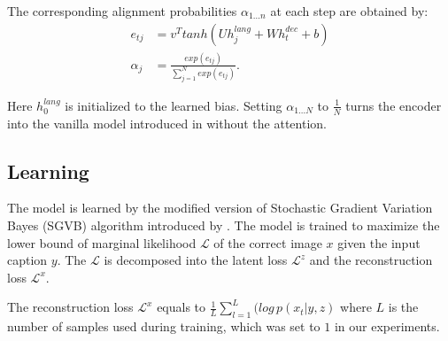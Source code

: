 \documentclass{article} %
\newcommand{\hlang}{h^{lang}}
\newcommand{\hdec}{h^{dec}}
\newcommand{\loss}{\mathcal{L}}
\newcommand{\lloss}{\mathcal{L}^{z}}
\newcommand{\rloss}{\mathcal{L}^{x}}
\begin{document}
The corresponding alignment probabilities $\alpha_{1...n}$ at each step are obtained by:
\begin{align}
e_{tj} &= v^{T}tanh(U\hlang_{j} + W\hdec_{t} + b)\\
\alpha_{j} &= \frac{exp(e_{tj})}{\sum_{j=1}^{N}exp(e_{tj})}.
\end{align}

Here $\hlang_{0}$ is initialized to the learned bias.
Setting $\alpha_{1...N}$ to $\frac{1}{N}$ turns the encoder into the vanilla model introduced in \citep{cho_mt} without the attention. 

\subsection{Learning}

The model is learned by the modified version of Stochastic Gradient Variation Bayes (SGVB) algorithm introduced by \cite{kingma_vae}. The model is trained to maximize the lower bound of marginal likelihood $\loss$ of the correct image $x$ given the input caption $y$. The $\loss$ is decomposed into the latent loss $\lloss$ and the reconstruction loss $\rloss$. 

The reconstruction loss $\rloss$ equals to $\frac{1}{L}\sum_{l=1}^{L}(log\,p(x_{t}|y,z)$ where $L$ is the number of samples used during training, which was set to $1$ in our experiments.
\end{document}
